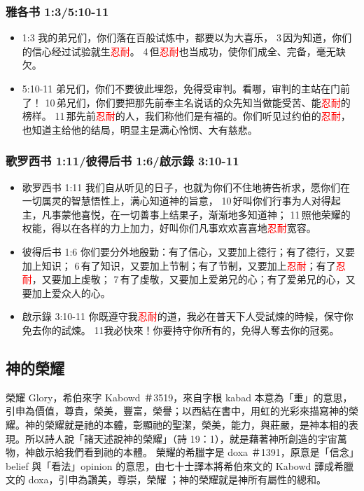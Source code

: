 \subsubsection{雅各书 1:3/5:10-11} 
\begin{itemize}[noitemsep]
\item 1:3 我的弟兄们，你们落在百般试炼中，都要以为大喜乐， 3 因为知道，你们的信心经过试验就生\textcolor{red}{忍耐}。 4 但\textcolor{red}{忍耐}也当成功，使你们成全、完备，毫无缺欠。

\item 5:10-11 弟兄们，你们不要彼此埋怨，免得受审判。看哪，审判的主站在门前了！ 10 弟兄们，你们要把那先前奉主名说话的众先知当做能受苦、能\textcolor{red}{忍耐}的榜样。 11 那先前\textcolor{red}{忍耐}的人，我们称他们是有福的。你们听见过约伯的\textcolor{red}{忍耐}，也知道主给他的结局，明显主是满心怜悯、大有慈悲。
\end{itemize}
\subsubsection{歌罗西书 1:11/彼得后书 1:6/啟示錄 3:10-11} 
\begin{itemize}[noitemsep]
\item 歌罗西书 1:11 我们自从听见的日子，也就为你们不住地祷告祈求，愿你们在一切属灵的智慧悟性上，满心知道神的旨意， 10 好叫你们行事为人对得起主，凡事蒙他喜悦，在一切善事上结果子，渐渐地多知道神； 11 照他荣耀的权能，得以在各样的力上加力，好叫你们凡事欢欢喜喜地\textcolor{red}{忍耐}宽容。
 
\item 彼得后书 1:6 你们要分外地殷勤：有了信心，又要加上德行；有了德行，又要加上知识； 6 有了知识，又要加上节制；有了节制，又要加上\textcolor{red}{忍耐}；有了\textcolor{red}{忍耐}，又要加上虔敬； 7 有了虔敬，又要加上爱弟兄的心；有了爱弟兄的心，又要加上爱众人的心。

\item 啟示錄 3:10-11 你既遵守我\textcolor{red}{忍耐}的道，我必在普天下人受試煉的時候，保守你免去你的試煉。 11我必快來！你要持守你所有的，免得人奪去你的冠冕。
\end{itemize}









\subsection{神的榮耀}
榮耀 Glory，希伯來字 Kabowd ＃3519，來自字根 kabad 本意為「重」的意思，引申為價值，尊貴，榮美，豐富，榮譽；以西結在書中，用虹的光彩來描寫神的榮耀。神的榮耀就是祂的本體，彰顯祂的聖潔，榮美，能力，與莊嚴，是神本相的表現。所以詩人說「諸天述說神的榮耀」（詩 19：1），就是藉著神所創造的宇宙萬物，神啟示給我們看到祂的本體。
榮耀的希臘字是 doxa ＃1391，原意是「信念」belief 與「看法」opinion 的意思，由七十士譯本將希伯來文的 Kabowd 譯成希臘文的 doxa，引申為讚美，尊崇，榮耀 ；神的榮耀就是神所有屬性的總和。


